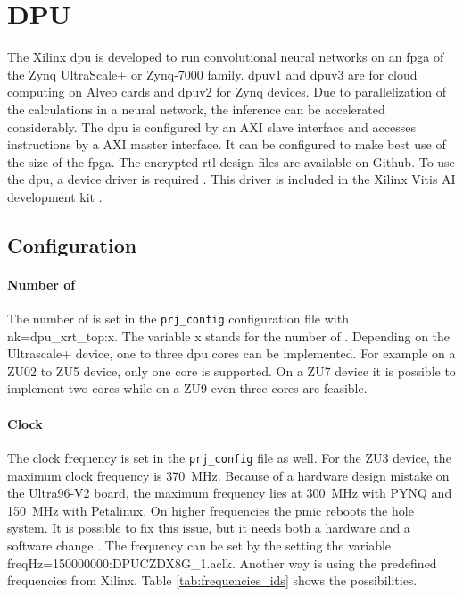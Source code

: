 \section{DPU}
\label{sec:embedded_platform:dpu}

The Xilinx \acrfull{dpu} is developed to run convolutional neural networks on an \acrshort{fpga} of the Zynq UltraScale+ or Zynq-7000 family.
\acrshort{dpu}v1 and \acrshort{dpu}v3 are for cloud computing on Alveo cards and \acrshort{dpu}v2 for Zynq devices. 
Due to parallelization of the calculations in a neural network, the inference can be accelerated considerably.
The \acrshort{dpu} is configured by an AXI slave interface and accesses instructions by a AXI master interface.
It can be configured to make best use of the size of the \acrshort{fpga}.
The encrypted \acrshort{rtl} design files are available on Github.
To use the \acrshort{dpu}, a device driver is required \cite{dpu_product_guide}.
This driver is included in the Xilinx Vitis AI development kit \cite{dpu_product_guide_v3_2}.

\subsection{Configuration}
\label{subsec:embedded_platform:dpu:configuration}
\paragraph{Number of }
The number of  is set in the \texttt{prj\_config} configuration file with nk=dpu\_xrt\_top:x.
The variable x stands for the number of .
Depending on the Ultrascale+ device, one to three \acrshort{dpu} cores can be implemented.
For example on a ZU02 to ZU5 device, only one core is supported.
On a ZU7 device it is possible to implement two cores while on a ZU9 even three cores are feasible.

\paragraph{Clock}
The clock frequency is set in the \texttt{prj\_config} file as well.
For the ZU3 device, the maximum clock frequency is \SI{370}{MHz}.
Because of a hardware design mistake on the Ultra96-V2 board, the maximum frequency lies at \SI{300}{MHz} with PYNQ and \SI{150}{MHz} with Petalinux.
On higher frequencies the \acrfull{pmic} reboots the hole system.
It is possible to fix this issue, but it needs both a hardware and a software change \cite{pmic_issue}.
The frequency can be set  by the setting the variable  freqHz=150000000:DPUCZDX8G\_1.aclk.
Another way is using the predefined frequencies from Xilinx.
Table \ref{tab:frequencies_ids} shows the possibilities.

